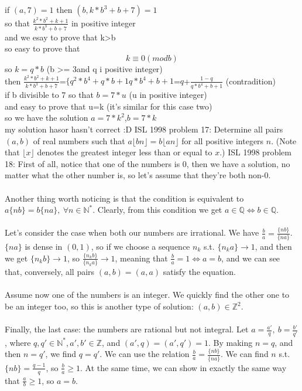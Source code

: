 if $(a,7)=1$ then $(b,k*b^3+b+7)=1$ \\
so that $\frac {k^2*b^2+k+1}{k*b^3+b+7}$ in positive integer \\
and we esay to prove that k>b \\
so easy to prove that
\[ k\equiv 0 (mod b) \]
so $k=q*b$ (b  >= 3and q i positive integer) \\
then $\frac {k^2*b^2+k+1}{k*b^3+b+7}$=${\{q^2*b^4+q*b+1}{q*b^4+b+1}$=$q$+$\frac {1-q}{q*b^4+b+1}$  (contradition) \\
if b divisible to 7 so that $b=7*u$ (u in positive integer) \\
and easy to prove that u=k (it's similar for this case two) \\
so we have the solution $a=7*k^2$,$b=7*k$ \\
my solution hasor hasn't correct :D 
ISL 1998 problem 17:  Determine all pairs $(a,b)$ of real numbers such that $a \lfloor bn \rfloor =b \lfloor an \rfloor $ for all positive integers $n$. (Note that $\lfloor x\rfloor $ denotes the greatest integer less than or equal to $x$.) 
ISL 1998 problem 18:  First of all, notice that one of the numbers is $0$, then we have a solution, no matter what the other number is, so let's assume that they're both non-$0$. \\\\
Another thing worth noticing is that the condition is equivalent to $a\{nb\}=b\{na\},\ \forall n\in\mathbb N^*$. Clearly, from this condition we get $a\in\mathbb Q\iff b\in\mathbb Q$. \\\\
Let's consider the case when both our numbers are irrational. We have $\frac ba=\frac{\{nb\}}{\{na\}}$. $\{na\}$ is dense in $(0,1)$, so if we choose a sequence $n_k$ s.t. $\{n_ka\}\to 1$, and then we get $\{n_kb\}\to 1$, so $\frac{\{n_kb\}}{\{n_ka\}}\to 1$, meaning that $\frac ba=1\iff a=b$, and we can see that, conversely, all pairs $(a,b)=(a,a)$ satisfy the equation. \\\\
Assume now one of the numbers is an integer. We quickly find the other one to be an integer too, so this is another type of solution: $(a,b)\in\mathbb Z^2$. \\\\
Finally, the last case: the numbers are rational but not integral. Let $a=\frac{a'}q,\ b=\frac {b'}{q'}$, where $q,q'\in\mathbb N^*,a',b'\in\mathbb Z$, and $(a',q)=(a',q')=1$. By making $n=q$, and then $n=q'$, we find $q=q'$. We can use the relation $\frac ba=\frac{\{nb\}}{\{na\}}$. We can find $n$ s.t. $\{nb\}=\frac{q-1}q$, so $\frac ba\ge 1$. At the same time, we can show in exactly the same way that $\frac ab\ge 1$, so $a=b$. \\\\
